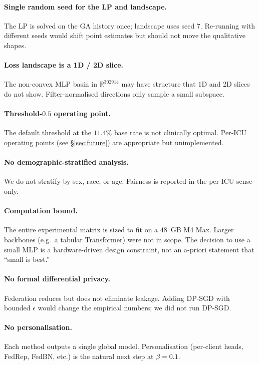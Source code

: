 \paragraph{Single random seed for the LP and landscape.} The LP is solved on
the GA history once; landscape uses seed $7$. Re-running with different seeds
would shift point estimates but should not move the qualitative shapes.

\paragraph{Loss landscape is a 1D / 2D slice.} The non-convex MLP basin in
$\mathbb{R}^{302914}$ may have structure that 1D and 2D slices do not show.
Filter-normalised directions only sample a small subspace.

\paragraph{Threshold-$0.5$ operating point.} The default threshold at the
$11.4\%$ base rate is not clinically optimal. Per-ICU operating points
(see \S\ref{sec:future}) are appropriate but unimplemented.

\paragraph{No demographic-stratified analysis.} We do not stratify by sex,
race, or age. Fairness is reported in the per-ICU sense only.

\paragraph{Computation bound.} The entire experimental matrix is sized to fit
on a $48$~GB M4 Max. Larger backbones (e.g.\ a tabular Transformer) were not
in scope. The decision to use a small MLP is a hardware-driven design
constraint, not an a-priori statement that ``small is best.''

\paragraph{No formal differential privacy.} Federation reduces but does not
eliminate leakage. Adding DP-SGD with bounded $\epsilon$ would change
the empirical numbers; we did not run DP-SGD.

\paragraph{No personalisation.} Each method outputs a single global model.
Personalisation (per-client heads, FedRep, FedBN, etc.) is the natural next
step at $\beta\!=\!0.1$.

